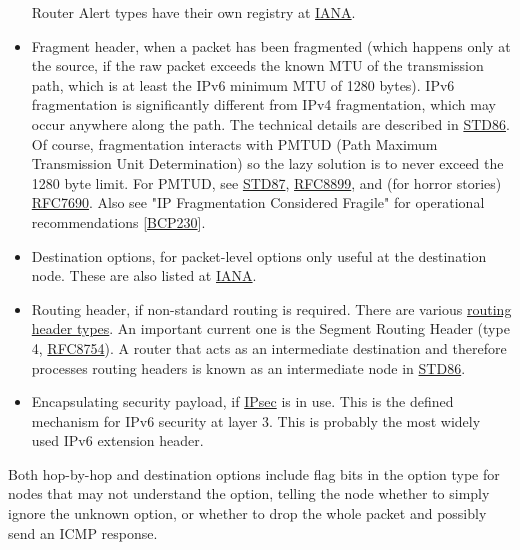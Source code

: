 \documentclass[
]{article}
\begin{document}
\begin{itemize}
  Router Alert types have their own registry at
  \href{https://www.iana.org/assignments/ipv6-routeralert-values/ipv6-routeralert-values.xhtml}{IANA}.
\item
  Fragment header, when a packet has been fragmented (which happens only
  at the source, if the raw packet exceeds the known MTU of the
  transmission path, which is at least the IPv6 minimum MTU of 1280
  bytes). IPv6 fragmentation is significantly different from IPv4
  fragmentation, which may occur anywhere along the path. The technical
  details are described in
  \href{https://www.rfc-editor.org/info/std86}{STD86}. Of course,
  fragmentation interacts with PMTUD (Path Maximum Transmission Unit
  Determination) so the lazy solution is to never exceed the 1280 byte
  limit. For PMTUD, see
  \href{https://www.rfc-editor.org/info/std87}{STD87},
  \href{https://www.rfc-editor.org/info/rfc8899}{RFC8899}, and (for
  horror stories)
  \href{https://www.rfc-editor.org/info/rfc7690}{RFC7690}. Also see "IP
  Fragmentation Considered Fragile" for operational recommendations
  {[}\href{https://www.rfc-editor.org/info/bcp230}{BCP230}{]}.
\item
  Destination options, for packet-level options only useful at the
  destination node. These are also listed at
  \href{https://www.iana.org/assignments/ipv6-parameters/ipv6-parameters.xhtml\#ipv6-parameters-2}{IANA}.
\item
  Routing header, if non-standard routing is required. There are various
  \href{https://www.iana.org/assignments/ipv6-parameters/ipv6-parameters.xhtml\#ipv6-parameters-2}{routing
  header types}. An important current one is the Segment Routing Header
  (type 4, \href{https://www.rfc-editor.org/info/rfc8754}{RFC8754}). A
  router that acts as an intermediate destination and therefore
  processes routing headers is known as an \textquotesingle intermediate
  node\textquotesingle{} in
  \href{https://www.rfc-editor.org/info/std86}{STD86}.
\item
  Encapsulating security payload, if
  \href{https://www.rfc-editor.org/info/rfc4303}{IPsec} is in use. This
  is the defined mechanism for IPv6 security at layer 3. This is
  probably the most widely used IPv6 extension header.
\end{itemize}

Both hop-by-hop and destination options include flag bits in the option
type for nodes that may not understand the option, telling the node
whether to simply ignore the unknown option, or whether to drop the
whole packet and possibly send an ICMP response.
\end{document}
